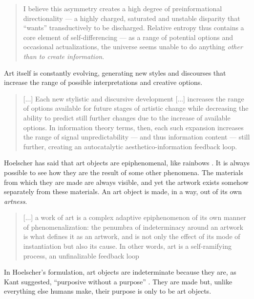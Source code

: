 \documentclass[letterpaper]{article}
\begin{document}
    \begin{quote}
        I believe this asymmetry creates a high degree of preinformational directionality — a highly charged, saturated and unstable disparity that “wants” transductively to be discharged. Relative entropy thus contains a core element of self-differencing — as a range of potential options and occasional actualizations, the universe seems unable to do anything \emph{other than to create information}.
    \end{quote}

    Art itself is constantly evolving, generating new styles and discourses that increase the range of possible interpretations and creative options.

    \begin{quote}
        [...] Each new stylistic and discursive development [...] increases the range of options available for future stages of artistic change while decreasing the ability to predict still further changes due to the increase of available options. In information theory terms, then, each such expansion increases the range of signal unpredictability — and thus information content — still further, creating an autocatalytic aesthetico-information feedback loop. \citep[p.2]{HoelscherThPtcsOfPhsSpc2014}
    \end{quote}

    Hoelscher has said that art objects are epiphenomenal, like rainbows \citep[p.17]{HoelscherArtAsInfrmtn2021}. It is always possible to see how they are the result of some other phenomena. The materials from which they are made are always visible, and yet the artwork exists somehow separately from these materials. An art object is made, in a way, out of its own \emph{artness}.
    
    \begin{quote}
        [...] a work of art is a complex adaptive epiphenomenon of its own manner of phenomenalization: the penumbra of indeterminacy around an artwork is what defines it as an artwork, and is not only the effect of its mode of instantiation but also its cause. In other words, art is a self-ramifying process, an unfinalizable feedback loop \citep[p.2]{HoelscherThPtcsOfPhsSpc2014}
    \end{quote}

    In Hoelscher's formulation, art objects are indeterminate because they are, as Kant suggested, “purposive without a purpose” \citep[p.57]{KantCrtqOfJdgmnt}. They are made but, unlike everything else humans make, their purpose is only to be art objects. 
\end{document}
